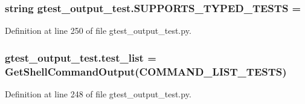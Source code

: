\subsubsection[{\texorpdfstring{S\+U\+P\+P\+O\+R\+T\+S\+\_\+\+T\+Y\+P\+E\+D\+\_\+\+T\+E\+S\+TS}{SUPPORTS_TYPED_TESTS}}]{\setlength{\rightskip}{0pt plus 5cm}string gtest\+\_\+output\+\_\+test.\+S\+U\+P\+P\+O\+R\+T\+S\+\_\+\+T\+Y\+P\+E\+D\+\_\+\+T\+E\+S\+TS = \textquotesingle{}}\hypertarget{namespacegtest__output__test_aa762abdf62ac6efe1aa2405b3f506380}{}\label{namespacegtest__output__test_aa762abdf62ac6efe1aa2405b3f506380}


Definition at line 250 of file gtest\+\_\+output\+\_\+test.\+py.

\subsubsection[{\texorpdfstring{test\+\_\+list}{test_list}}]{\setlength{\rightskip}{0pt plus 5cm}gtest\+\_\+output\+\_\+test.\+test\+\_\+list = {\bf Get\+Shell\+Command\+Output}({\bf C\+O\+M\+M\+A\+N\+D\+\_\+\+L\+I\+S\+T\+\_\+\+T\+E\+S\+TS})}\hypertarget{namespacegtest__output__test_aec4b3602697dfdee3283be82c5fe6232}{}\label{namespacegtest__output__test_aec4b3602697dfdee3283be82c5fe6232}


Definition at line 248 of file gtest\+\_\+output\+\_\+test.\+py.

